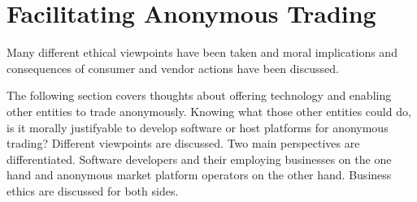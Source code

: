 \section{Facilitating Anonymous Trading}
\label{tech}


Many different ethical viewpoints have been taken and moral implications and consequences of consumer and vendor actions have been discussed.

The following section covers thoughts about offering technology and enabling other entities to trade anonymously. Knowing what those other entities could do, is it morally justifyable to develop software or host platforms for anonymous trading? Different viewpoints are discussed. Two main perspectives are differentiated. Software developers and their employing businesses on the one hand and anonymous market platform operators on the other hand. Business ethics are discussed for both sides. 






